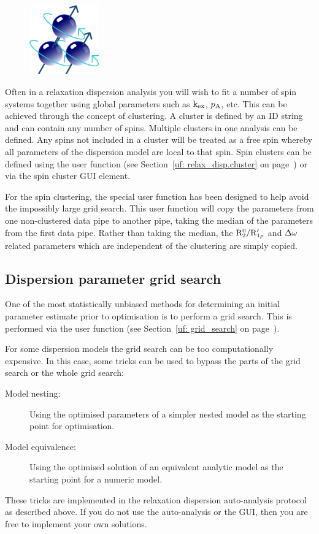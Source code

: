 \begin{figure}[h]
  \includegraphics[width=3cm, bb=14 14 399 399]{graphics/misc/cluster_600x600}
\end{figure}

Often in a relaxation dispersion analysis you will wish to fit a number of spin systems together using global parameters such as $\textrm{k}_\textrm{ex}$, $p_\textrm{A}$, etc.
This can be achieved through the concept of clustering.
A cluster is defined by an ID string and can contain any number of spins.
Multiple clusters in one analysis can be defined.
Any spins not included in a cluster will be treated as a free spin whereby all parameters of the dispersion model are local to that spin.
Spin clusters can be defined using the  user function (see Section~\ref{uf: relax_disp.cluster} on page~\pageref{uf: relax_disp.cluster}) or via the spin cluster GUI element.

For the spin clustering, the special  user function has been designed to help avoid the impossibly large grid search.
This user function will copy the parameters from one non-clustered data pipe to another pipe, taking the median of the parameters from the first data pipe.
Rather than taking the median, the $\mathrm{R}_2^0/\mathrm{R}_{1\rho}'$ and $\Delta\omega$ related parameters which are independent of the clustering are simply copied.



\subsection{Dispersion parameter grid search}
\label{sect: Dispersion parameter grid search}

One of the most statistically unbiased methods for determining an initial parameter estimate prior to optimisation is to perform a grid search.
This is performed via the  user function (see Section~\ref{uf: grid_search} on page~\pageref{uf: grid_search}).


For some dispersion models the grid search can be too computationally expensive.
In this case, some tricks can be used to bypass the parts of the grid search or the whole grid search:
\begin{description}
  \item[Model nesting:]  Using the optimised parameters of a simpler nested model as the starting point for optimisation.
  \item[Model equivalence:]  Using the optimised solution of an equivalent analytic model as the starting point for a numeric model.
\end{description}
These tricks are implemented in the relaxation dispersion auto-analysis protocol as described above.
If you do not use the auto-analysis or the GUI, then you are free to implement your own solutions.

